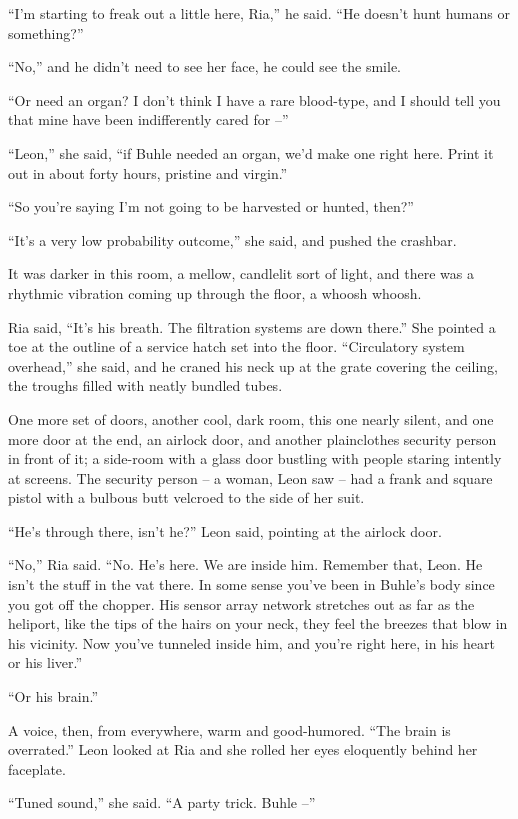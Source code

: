 “I'm starting to freak out a little here, Ria,” he said. “He 
doesn't hunt humans or something?”

“No,” and he didn't need to see her face, he could see the smile.

“Or need an organ? I don't think I have a rare blood-type, and I 
should tell you that mine have been indifferently cared for --”

“Leon,” she said, “if Buhle needed an organ, we'd make one right 
here. Print it out in about forty hours, pristine and virgin.”

“So you're saying I'm not going to be harvested or hunted, then?”

“It's a very low probability outcome,” she said, and pushed the 
crashbar.

It was darker in this room, a mellow, candlelit sort of light, and 
there was a rhythmic vibration coming up through the floor, a whoosh 
whoosh.

Ria said, “It's his breath. The filtration systems are down there.” 
She pointed a toe at the outline of a service hatch set into the floor. 
“Circulatory system overhead,” she said, and he craned his neck up 
at the grate covering the ceiling, the troughs filled with neatly 
bundled tubes.

One more set of doors, another cool, dark room, this one nearly silent, 
and one more door at the end, an airlock door, and another plainclothes 
security person in front of it; a side-room with a glass door bustling 
with people staring intently at screens. The security person -- a 
woman, Leon saw -- had a frank and square pistol with a bulbous butt 
velcroed to the side of her suit.

“He's through there, isn't he?” Leon said, pointing at the airlock 
door.

“No,” Ria said. “No. He's here. We are inside him. Remember that, 
Leon. He isn't the stuff in the vat there. In some sense you've been in 
Buhle's body since you got off the chopper. His sensor array network 
stretches out as far as the heliport, like the tips of the hairs on 
your neck, they feel the breezes that blow in his vicinity. Now you've 
tunneled inside him, and you're right here, in his heart or his 
liver.”

“Or his brain.”

A voice, then, from everywhere, warm and good-humored. “The brain is 
overrated.” Leon looked at Ria and she rolled her eyes eloquently 
behind her faceplate.

“Tuned sound,” she said. “A party trick. Buhle --”

